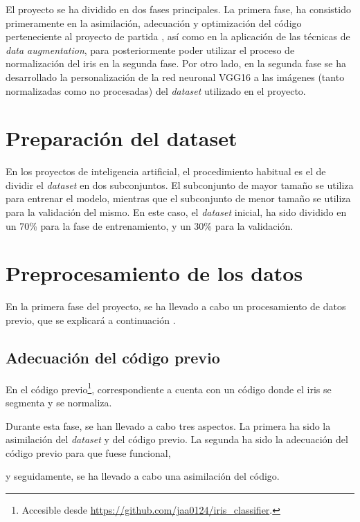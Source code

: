  \label{capitulo5}

El proyecto se ha dividido en dos fases principales. La primera fase, ha consistido primeramente en la asimilación, adecuación y optimización del código perteneciente
al proyecto de partida \cite{tfg_iris_2020}, así como en la aplicación de las técnicas de \textit{data augmentation}, para posteriormente poder utilizar el proceso de normalización del iris en la segunda fase. 
Por otro lado, en la segunda fase se ha desarrollado la personalización de la red neuronal VGG16 a las imágenes (tanto normalizadas como no procesadas) del \textit{dataset} utilizado en el proyecto.


\section{Preparación del dataset}

En los proyectos de inteligencia artificial, el procedimiento habitual es el de dividir el \textit{dataset} en dos subconjuntos. El subconjunto de mayor tamaño se utiliza para entrenar el modelo, 
mientras que el subconjunto de menor tamaño se utiliza para la validación del mismo. En este caso, el  \textit{dataset} inicial, ha sido dividido en un 70\% para la fase de entrenamiento, y un 30\% para la validación. 

\section{Preprocesamiento de los datos}

En la primera fase del proyecto, se ha llevado a cabo un procesamiento de datos previo, que se explicará a continuación .

\subsection{Adecuación del código previo}

En el código previo\footnote{Accesible desde \url{https://github.com/jaa0124/iris_classifier}.}, correspondiente a \cite{tfg_iris_2020} cuenta con un código donde el iris se segmenta y se normaliza.

Durante esta fase, se han llevado a cabo tres aspectos. La primera ha sido la asimilación del \textit{dataset} y del código previo. La segunda ha sido la adecuación del código previo para que fuese funcional,

y seguidamente, se ha llevado a cabo una asimilación del código. 

